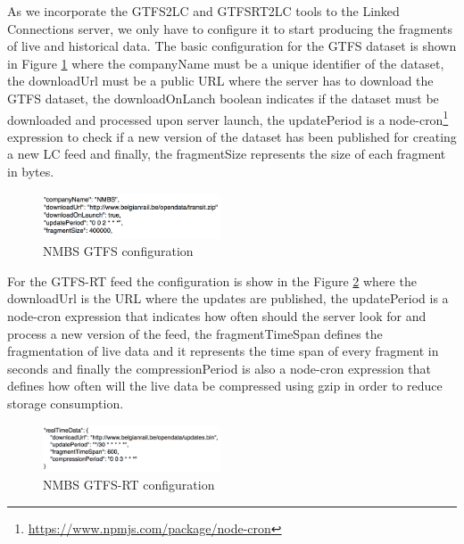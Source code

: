 \documentclass[sw]{iosart2x}
\begin{document}
	As we incorporate the GTFS2LC and GTFSRT2LC tools to the Linked Connections server, we only have to configure it to start producing the fragments of live and historical data. The basic configuration for the GTFS dataset is shown in Figure \ref{fig:nmbs_server} where the companyName must be a unique identifier of the dataset, the downloadUrl must be a public URL where the server has to download the GTFS dataset, the downloadOnLanch boolean indicates if the dataset must be downloaded and processed upon server launch, the updatePeriod is a node-cron\footnote{\url{https://www.npmjs.com/package/node-cron}} expression to check if a new version of the dataset has been published for creating a new LC feed and finally, the fragmentSize represents the size of each fragment in bytes.
	
	\begin{figure}[t]
		\includegraphics[width=0.47\textwidth]{images/nmbs_server.png}
		\caption{NMBS GTFS configuration}\label{fig:nmbs_server}
	\end{figure}
	
	For the GTFS-RT feed the configuration is show in the Figure \ref{fig:nmbs_rt_server} where the downloadUrl is the URL where the updates are published, the updatePeriod is a node-cron expression that indicates  how often should the server look for and process a new version of the feed, the fragmentTimeSpan defines the fragmentation of live data and it represents the time span of every fragment in seconds and finally the compressionPeriod is also a node-cron expression that defines how often will the live data be compressed using gzip in order to reduce storage consumption.
	
	\begin{figure}[t]
		\includegraphics[width=0.47\textwidth]{images/nmbs_rt_server.png}
		\caption{NMBS GTFS-RT configuration}\label{fig:nmbs_rt_server}
	\end{figure}
	
\end{document}

